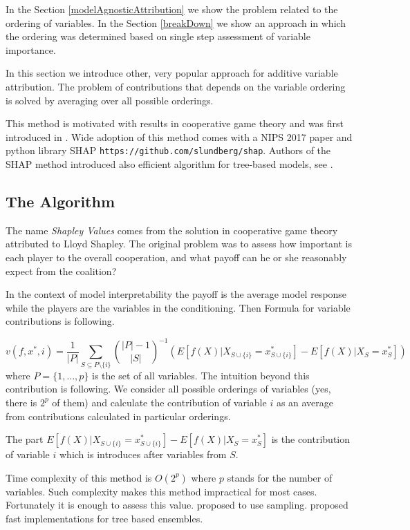 \documentclass[]{krantz}
\theoremstyle{definition}
\theoremstyle{definition}
\theoremstyle{definition}
\theoremstyle{remark}
\begin{document}
In the Section \ref{modelAgnosticAttribution} we show the problem
related to the ordering of variables. In the Section \ref{breakDown} we
show an approach in which the ordering was determined based on single
step assessment of variable importance.

In this section we introduce other, very popular approach for additive
variable attribution. The problem of contributions that depends on the
variable ordering is solved by averaging over all possible orderings.

This method is motivated with results in cooperative game theory and was
first introduced in \citep{Strumbelj2014}. Wide adoption of this method
comes with a NIPS 2017 paper \citep{SHAP} and python library SHAP
\texttt{https://github.com/slundberg/shap}. Authors of the SHAP method
introduced also efficient algorithm for tree-based models, see
\citep{TreeSHAP}.

\hypertarget{the-algorithm-2}{%
\subsection{The Algorithm}\label{the-algorithm-2}}

The name \emph{Shapley Values} comes from the solution in cooperative
game theory attributed to Lloyd Shapley. The original problem was to
assess how important is each player to the overall cooperation, and what
payoff can he or she reasonably expect from the coalition?
\citep{shapleybook1952}

In the context of model interpretability the payoff is the average model
response while the players are the variables in the conditioning. Then
Formula for variable contributions is following.

\[
v(f, x^*, i) = \frac 1{|P|}\sum_{S \subseteq P\setminus \{i\}}  {{|P|-1}\choose{|S|}}^{-1} \left(E [f(X) | X_{S \cup \{i\}} = x^*_{S \cup \{i\}}] - E [f(X) | X_{S} = x^*_{S}]\right)
\] where \(P = \{1, \ldots, p\}\) is the set of all variables. The
intuition beyond this contribution is following. We consider all
possible orderings of variables (yes, there is \(2^p\) of them) and
calculate the contribution of variable \(i\) as an average from
contributions calculated in particular orderings.

The part
\(E[f(X) | X_{S \cup \{i\}} = x^*_{S \cup \{i\}}] - E [f(X) | X_{S} = x^*_{S}]\)
is the contribution of variable \(i\) which is introduces after
variables from \(S\).

Time complexity of this method is \(O(2^p)\) where \(p\) stands for the
number of variables. Such complexity makes this method impractical for
most cases. Fortunately it is enough to assess this value.
\citep{Strumbelj2014} proposed to use sampling. \citep{TreeSHAP}
proposed fast implementations for tree based ensembles.
\end{document}

